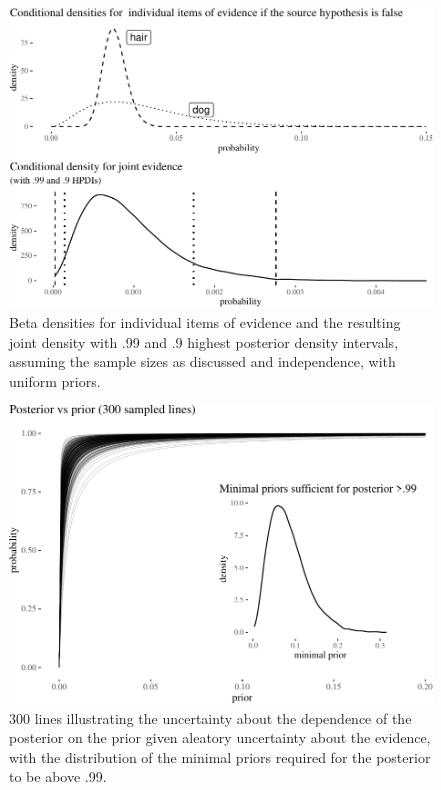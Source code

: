 \documentclass[
  10pt,
  dvipsnames,enabledeprecatedfontcommands]{scrartcl}
\begin{document}
\begin{figure}[H]

\begin{center}\includegraphics[width=0.8\linewidth]{imprecision_philosophical_paper._files/figure-latex/fig:densities-1} \end{center}
\caption{Beta densities for individual items of evidence and the resulting joint density with .99 and .9 highest posterior density intervals, assuming the sample sizes as discussed and independence, with uniform priors.}
\label{fig:densities}
\end{figure}

\begin{figure}[H]

\begin{center}\includegraphics[width=0.6\linewidth]{imprecision_philosophical_paper._files/figure-latex/fig:lines5-1} \end{center}

\caption{300 lines illustrating the uncertainty about the dependence of the posterior on the prior given aleatory uncertainty about the evidence, with the distribution of the minimal priors required for the posterior to be above .99.}

\label{fig:lines}

\end{figure}
\end{document}
